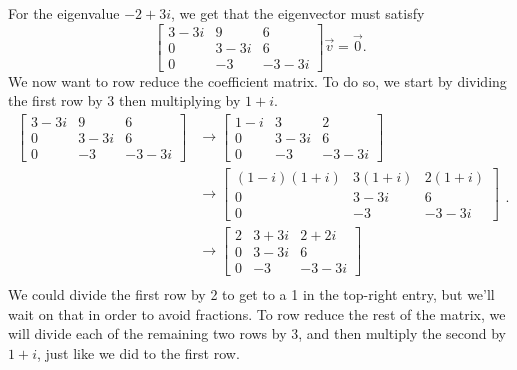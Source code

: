 \documentclass{ximera}
\begin{document}
\begin{exampleSol}
    For the eigenvalue $-2 + 3i$, we get that the eigenvector must satisfy
    \[ 
        \begin{bmatrix} 
            3 - 3i & 9 & 6 \\ 
            0 & 3-3i & 6 \\ 
            0 & -3 & -3-3i 
        \end{bmatrix} 
        \vec{v} = \vec{0}. 
    \] 
    We now want to row reduce the coefficient matrix. To do so, we start by dividing the first row by 3 then multiplying by $1+i$. 
    \[ 
        \begin{split}
            \begin{bmatrix} 
                3 - 3i & 9 & 6 \\ 
                0 & 3-3i & 6 \\ 
                0 & -3 & -3-3i 
            \end{bmatrix} 
            &\rightarrow 
            \begin{bmatrix} 
                1 - i & 3 & 2 \\ 
                0 & 3-3i & 6 \\ 
                0 & -3 & -3-3i 
            \end{bmatrix} \\
            &\rightarrow 
            \begin{bmatrix} 
                (1 - i)(1+i) & 3(1+i) & 2(1+i) \\ 
                0 & 3-3i & 6 \\ 
                0 & -3 & -3-3i 
            \end{bmatrix}\\
            &\rightarrow 
            \begin{bmatrix} 
                2 & 3+3i & 2+2i \\ 
                0 & 3-3i & 6 \\ 
                0 & -3 & -3-3i 
            \end{bmatrix}\\
        \end{split}. 
    \] 
    We could divide the first row by 2 to get to a 1 in the top-right entry, but we'll wait on that in order to avoid fractions. To row reduce the rest of the matrix, we will divide each of the remaining two rows by 3, and then multiply the second by $1+i$, just like we did to the first row. 
    

\end{exampleSol}
\end{document}
